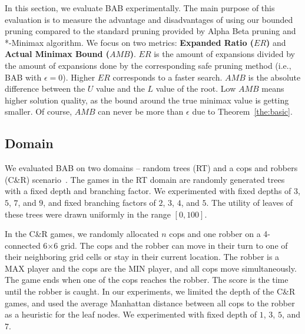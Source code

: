 \documentclass[letterpaper]{article} %
\newcommand{\pess}{\mathit{L}}
\newcommand{\opti}{\mathit{U}}
\newcommand{\amb}{\mathit{AMB}}
\newcommand{\er}{\mathit{ER}}
\begin{document}
In this section, we evaluate BAB experimentally. 
The main purpose of this evaluation is to measure the advantage and disadvantages of using our bounded pruning compared to the standard pruning provided by Alpha Beta pruning and *-Minimax algorithm. We focus on two metrics: {\bf Expanded Ratio ($\er$)} and {\bf Actual Minimax Bound ($\amb$)}. $\er$ is the amount of expansions divided by the amount of expansions done by the corresponding safe pruning method (i.e., BAB with $\epsilon=0$). Higher $\er$ corresponds to a faster search. 
$\amb$ is the absolute difference between the $\opti$ value and the $\pess$ value of the root. Low $\amb$ means higher solution quality, as the bound around the true minimax value is getting smaller. Of course, $\amb$ can never be more than $\epsilon$ due to Theorem~\ref{the:basic}.




\subsection{Domain}
We evaluated BAB on two domains -- random trees (RT) and a cops and robbers (C\&R) scenario~\cite{carstens-paper}. The games in the RT domain are randomly generated trees with a fixed depth and branching factor. We experimented with 
fixed depths of $3$, $5$, $7$, and $9$, and fixed branching factors of $2$, $3$, $4$, and $5$. 
The utility of leaves of these trees were drawn uniformly in the range $[0, 100]$. 

In the C\&R games, we randomly allocated $n$ cops and one robber on a 4-connected 6$\times$6 grid. The cops and the robber can move in their turn to one of their neighboring grid cells or stay in their current location. The robber is a MAX player and the cops are the MIN player, and all cops move simultaneously. The game ends when one of the cops reaches the robber. The score is the time until the robber is caught. 
In our experiments, we limited the depth of the C\&R games, and used the average Manhattan distance between all cops to the robber as a heuristic for the leaf nodes. We experimented with fixed depth of $1$, $3$, $5$, and $7$.
\end{document}
